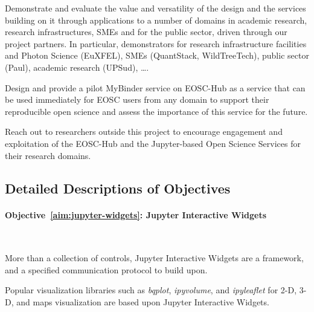 \begin{compactenum}
\item \label{aim:demonstrators}%
  Demonstrate and evaluate the value and versatility of the design and
  the services building on it through applications to a number of
  domains in academic research, research infrastructures, SMEs and for
  the public sector, driven through our project partners. In
  particular, demonstrators for research infrastructure facilities and
  Photon Science (EuXFEL), SMEs (QuantStack, WildTreeTech), public
  sector (Paul), academic research (UPSud), \ldots.


\item \label{aim:binderservice}%
  Design and provide a pilot MyBinder service on EOSC-Hub as a service
  that can be used immediately for EOSC users from any domain to
  support their reproducible open science and assess the importance of
  this service for the future.

\item \label{aim:outreach-and-engagement}%
  Reach out to researchers outside this project to encourage engagement
  and exploitation of the EOSC-Hub and the Jupyter-based Open Science
  Services for their research domains.


\end{compactenum}

\subsection*{Detailed Descriptions of Objectives}

\paragraph{Objective~\ref{aim:jupyter-widgets}: Jupyter Interactive Widgets}\

More than a collection of controls, Jupyter Interactive Widgets are a
framework, and a specified communication protocol to build upon.

Popular visualization libraries such as \emph{bqplot}, \emph{ipyvolume}, and
\emph{ipyleaflet} for 2-D, 3-D, and maps visualization are based upon Jupyter
Interactive Widgets.

